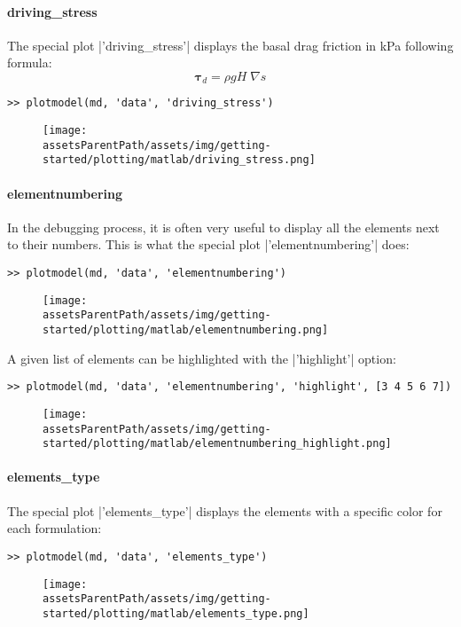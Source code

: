 \paragraph{driving\_stress}%
The special plot \lstinlinebg|'driving_stress'| displays the basal drag friction in kPa following formula:
\begin{equation}
	\boldsymbol{\tau}_d = \rho g H\;\nabla s
	\label{plotspecial_driving_stress}
\end{equation}
\begin{lstlisting}
>> plotmodel(md, 'data', 'driving_stress')
\end{lstlisting}
\begin{figure}[H]
	\begin{center}
		\texttt{[image: \\assetsParentPath/assets/img/getting-started/plotting/matlab/driving\_stress.png]}
	\end{center}
\end{figure}
\paragraph{elementnumbering}%
In the debugging process, it is often very useful to display all the elements next to their numbers. This is what the special plot \lstinlinebg|'elementnumbering'| does:
\begin{lstlisting}
>> plotmodel(md, 'data', 'elementnumbering')
\end{lstlisting}
\begin{figure}[H]
	\begin{center}
		\texttt{[image: \\assetsParentPath/assets/img/getting-started/plotting/matlab/elementnumbering.png]}
	\end{center}
\end{figure}
A given list of elements can be highlighted with the \lstinlinebg|'highlight'| option:
\begin{lstlisting}
>> plotmodel(md, 'data', 'elementnumbering', 'highlight', [3 4 5 6 7])
\end{lstlisting}
\begin{figure}[H]
	\begin{center}
		\texttt{[image: \\assetsParentPath/assets/img/getting-started/plotting/matlab/elementnumbering\_highlight.png]}
	\end{center}
\end{figure}
\paragraph{elements\_type}%
The special plot \lstinlinebg|'elements_type'| displays the elements with a specific color for each formulation:
\begin{lstlisting}
>> plotmodel(md, 'data', 'elements_type')
\end{lstlisting}
\begin{figure}[H]
	\begin{center}
		\texttt{[image: \\assetsParentPath/assets/img/getting-started/plotting/matlab/elements\_type.png]}
	\end{center}
\end{figure}

